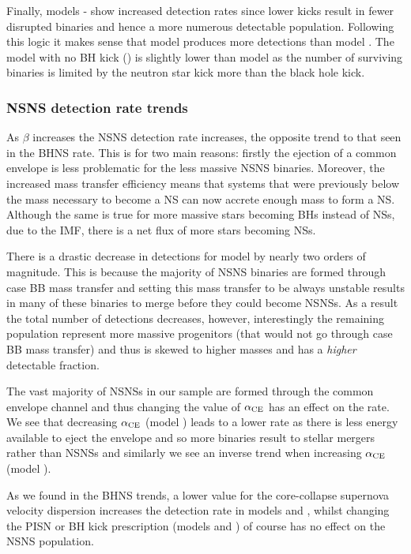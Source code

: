 Finally, models \modSigLow{}-\modNoBH{} show increased detection rates since lower kicks result in fewer disrupted binaries and hence a more numerous detectable population. Following this logic it makes sense that model \modSigLower{} produces more detections than model \modSigLow{}. The model with no BH kick (\modNoBH{}) is slightly lower than model \modSigLower{} as the number of surviving binaries is limited by the neutron star kick more than the black hole kick.

\subsubsection{NSNS detection rate trends}\label{sec:NSNS_detection_trends}

As $\beta$ increases the NSNS detection rate increases, the opposite trend to that seen in the BHNS rate. This is for two main reasons: firstly the ejection of a common envelope is less problematic for the less massive NSNS binaries. Moreover, the increased mass transfer efficiency means that systems that were previously below the mass necessary to become a NS can now accrete enough mass to form a NS. Although the same is true for more massive stars becoming BHs instead of NSs, due to the IMF, there is a net flux of more stars becoming NSs.

There is a drastic decrease in detections for model \modCaseBB{} by nearly two orders of magnitude. This is because the majority of NSNS binaries are formed through case BB mass transfer and setting this mass transfer to be always unstable results in many of these binaries to merge before they could become NSNSs. As a result the total number of detections decreases, however, interestingly the remaining population represent more massive progenitors (that would not go through case BB mass transfer) and thus is skewed to higher masses and has a \textit{higher} detectable fraction.

The vast majority of NSNSs in our sample are formed through the common envelope channel and thus changing the value of $\alpha_{\rm CE}$ has an effect on the rate. We see that decreasing $\alpha_{\rm CE}$ (model \modAlphaLow) leads to a lower rate as there is less energy available to eject the envelope and so more binaries result to stellar mergers rather than NSNSs and similarly we see an inverse trend when increasing $\alpha_{\rm CE}$ (model \modAlphaHigh).

As we found in the BHNS trends, a lower value for the core-collapse supernova velocity dispersion increases the detection rate in models \modSigLow{} and \modSigLower{}, whilst changing the PISN or BH kick prescription (models \modNoPISN{} and \modNoBH{}) of course has no effect on the NSNS population.

